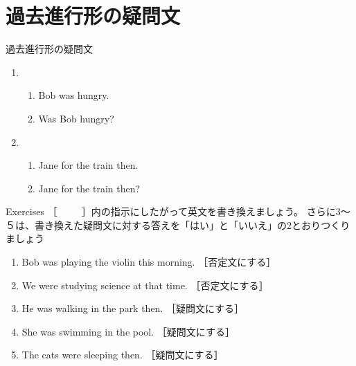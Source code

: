 \documentclass[aspectratio=169,xcolor={dvipsnames,table}]{beamer}
\begin{document}
\section{過去進行形の疑問文}
\begin{frame}[plain]{過去進行形の疑問文}
  \begin{enumerate}
  \item \begin{enumerate}
	 \item<1-> Bob was hungry.
	 \item<2-> Was Bob hungry?
	\end{enumerate}
  \item \begin{enumerate}
	 \item<3-> Jane  for the train then.
	 \item<4->  Jane  for the train then?
	\end{enumerate}

 \end{enumerate}
\hfill{}

\end{frame}
\begin{frame}[plain]{Exercises}
 ［~~~~~］内の指示にしたがって英文を書き換えましょう。
さらに3～５は、書き換えた疑問文に対する答えを「はい」と「いいえ」の2とおりつくりましょう\hfill{}

\begin{enumerate}
 \item Bob was playing the violin this morning. ［否定文にする］\\
 \item We were studying science at that time. ［否定文にする］\\
 \item He was walking in the park then. ［疑問文にする］\\
 \item She was swimming in the pool. ［疑問文にする］\\
 \item The cats were sleeping then. ［疑問文にする］\\

\end{enumerate}

\end{frame}
\end{document}
